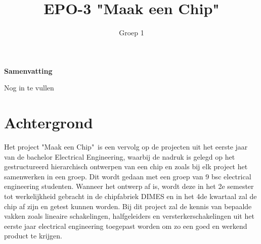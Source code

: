 \documentclass[11pt,twoside,a4paper]{article}
\title{EPO-3 "Maak een Chip"}
\author{Groep 1}
\date{}
\begin{document}
\maketitle
\thispagestyle{empty}
\vspace{30 mm}
\begin{center}
\Large \bf 
Samenvatting
\end{center}
Nog in te vullen
\clearpage

\tableofcontents
\clearpage

\section{Achtergrond}
Het project "Maak een Chip"\ is een vervolg op de projecten uit het eerste jaar van de bachelor Electrical Engineering, waarbij de nadruk is gelegd op het gestructureerd hierarchisch ontwerpen van een chip en zoals bij elk project het samenwerken in een groep. Dit wordt gedaan met een groep van 9 bsc electrical engineering studenten. Wanneer het ontwerp af is, wordt deze in het 2e semester tot werkelijkheid gebracht in de chipfabriek DIMES en in het 4de kwartaal zal de chip af zijn en getest kunnen worden. Bij dit project zal de kennis van bepaalde vakken zoals lineaire schakelingen, halfgeleiders en versterkerschakelingen uit het eerste jaar electrical engineering toegepast worden om zo een goed en werkend product te krijgen.
\end{document}
